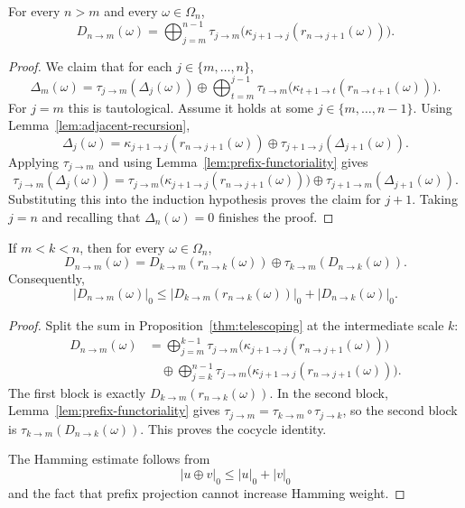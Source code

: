 \begin{proposition}
\label{thm:telescoping}
For every $n>m$ and every $\omega\in\Omega_n$,
\[
D_{n\to m}(\omega)
=
\bigoplus_{j=m}^{n-1}
\tau_{j\to m}\bigl(\kappa_{j+1\to j}(r_{n\to j+1}(\omega))\bigr).
\]
\end{proposition}

\begin{proof}
We claim that for each $j\in\{m,\dots,n\}$,
\[
\Delta_m(\omega)
=
\tau_{j\to m}(\Delta_j(\omega))
\oplus
\bigoplus_{t=m}^{j-1}
\tau_{t\to m}\bigl(\kappa_{t+1\to t}(r_{n\to t+1}(\omega))\bigr).
\]
For $j=m$ this is tautological.  Assume it holds at some
$j\in\{m,\dots,n-1\}$.  Using Lemma~\ref{lem:adjacent-recursion},
\[
\Delta_j(\omega)
=
\kappa_{j+1\to j}(r_{n\to j+1}(\omega))
\oplus
\tau_{j+1\to j}(\Delta_{j+1}(\omega)).
\]
Applying $\tau_{j\to m}$ and using Lemma~\ref{lem:prefix-functoriality} gives
\[
\tau_{j\to m}(\Delta_j(\omega))
=
\tau_{j\to m}\bigl(\kappa_{j+1\to j}(r_{n\to j+1}(\omega))\bigr)
\oplus
\tau_{j+1\to m}(\Delta_{j+1}(\omega)).
\]
Substituting this into the induction hypothesis proves the claim for $j+1$.
Taking $j=n$ and recalling that $\Delta_n(\omega)=0$ finishes the proof.
\end{proof}

\begin{proposition}
\label{prop:cocycle}
If $m<k<n$, then for every $\omega\in\Omega_n$,
\[
D_{n\to m}(\omega)
=
D_{k\to m}(r_{n\to k}(\omega))
\oplus
\tau_{k\to m}(D_{n\to k}(\omega)).
\]
Consequently,
\[
\lvert D_{n\to m}(\omega)\rvert_0
\le
\lvert D_{k\to m}(r_{n\to k}(\omega))\rvert_0
+
\lvert D_{n\to k}(\omega)\rvert_0.
\]
\end{proposition}

\begin{proof}
Split the sum in Proposition~\ref{thm:telescoping} at the intermediate scale $k$:
\[
\begin{aligned}
D_{n\to m}(\omega)
&=
\bigoplus_{j=m}^{k-1}
\tau_{j\to m}\bigl(\kappa_{j+1\to j}(r_{n\to j+1}(\omega))\bigr) \\
&\quad\oplus
\bigoplus_{j=k}^{n-1}
\tau_{j\to m}\bigl(\kappa_{j+1\to j}(r_{n\to j+1}(\omega))\bigr).
\end{aligned}
\]
The first block is exactly $D_{k\to m}(r_{n\to k}(\omega))$.  In the second
block, Lemma~\ref{lem:prefix-functoriality} gives
$\tau_{j\to m}=\tau_{k\to m}\circ\tau_{j\to k}$, so the second block is
$\tau_{k\to m}(D_{n\to k}(\omega))$.  This proves the cocycle identity.

The Hamming estimate follows from
\[
\lvert u\oplus v\rvert_0\le \lvert u\rvert_0+\lvert v\rvert_0
\]
and the fact that prefix projection cannot increase Hamming weight.
\end{proof}

